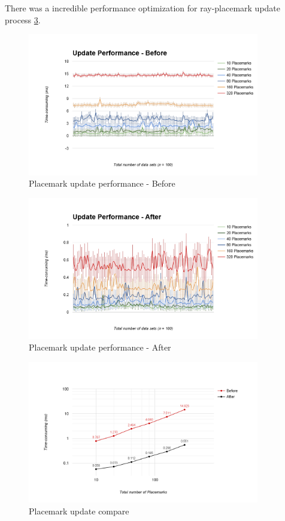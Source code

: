 There was a incredible performance optimization for ray-placemark update process \ref{fig:placemark-update-compare}. 

\begin{figure}[H]
	\caption{Placemark update performance - Before}
	\label{fig:placemark-update-performance-before}
	\centering
	\includegraphics[width=0.9\textwidth, keepaspectratio]{Figures/placemark-update-performance-before.png}
	\decoRule
\end{figure}

\begin{figure}[H]
	\caption{Placemark update performance - After}
	\label{fig:placemark-update-performance-after}
	\centering
	\includegraphics[width=0.9\textwidth, keepaspectratio]{Figures/placemark-update-performance-after.png}
	\decoRule
\end{figure}

\begin{figure}[H]
	\caption{Placemark update compare}
	\label{fig:placemark-update-compare}
	\centering
	\includegraphics[width=0.9\textwidth, keepaspectratio]{Figures/placemark-update-compare.png}
	\decoRule
\end{figure}

